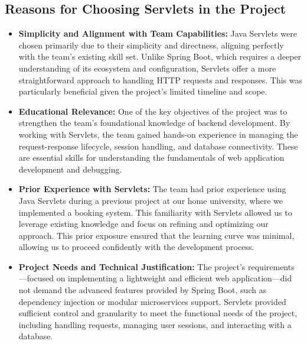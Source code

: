 \subsection{Reasons for Choosing Servlets in the Project}

\begin{itemize}
    \item \textbf{Simplicity and Alignment with Team Capabilities:} Java Servlets were chosen primarily due to their simplicity and directness, aligning perfectly with the team’s existing skill set. Unlike Spring Boot, which requires a deeper understanding of its ecosystem and configuration, Servlets offer a more straightforward approach to handling HTTP requests and responses. This was particularly beneficial given the project’s limited timeline and scope.

    \item \textbf{Educational Relevance:} One of the key objectives of the project was to strengthen the team’s foundational knowledge of backend development. By working with Servlets, the team gained hands-on experience in managing the request-response lifecycle, session handling, and database connectivity. These are essential skills for understanding the fundamentals of web application development and debugging.

    \item \textbf{Prior Experience with Servlets:} The team had prior experience using Java Servlets during a previous project at our home university, where we implemented a booking system. This familiarity with Servlets allowed us to leverage existing knowledge and focus on refining and optimizing our approach. This prior exposure ensured that the learning curve was minimal, allowing us to proceed confidently with the development process.

    \item \textbf{Project Needs and Technical Justification:} The project’s requirements—focused on implementing a lightweight and efficient web application—did not demand the advanced features provided by Spring Boot, such as dependency injection or modular microservices support. Servlets provided sufficient control and granularity to meet the functional needs of the project, including handling requests, managing user sessions, and interacting with a database.


\end{itemize}
